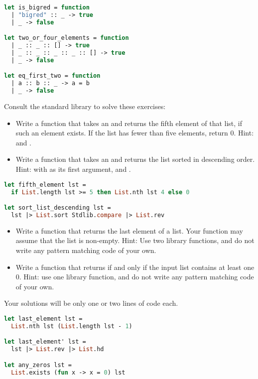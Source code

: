 \begin{lstlisting}[language=Caml]
let is_bigred = function
  | "bigred" :: _ -> true
  | _ -> false

let two_or_four_elements = function
  | _ :: _ :: [] -> true
  | _ :: _ :: _ :: _ :: [] -> true
  | _ -> false

let eq_first_two = function
  | a :: b :: _ -> a = b
  | _ -> false
\end{lstlisting}

\problem[library]
Consult the  standard library to solve these exercises:
\begin{itemize}
  \item Write a function that takes an  and returns the fifth element of that list, if such an element exists. If the list has fewer than five elements, return 0. Hint:  and .
  \item Write a function that takes an  and returns the list sorted in descending order. Hint:  with  as its first argument, and .
\end{itemize}

\begin{lstlisting}[language=OCaml]
let fifth_element lst =
  if List.length lst >= 5 then List.nth lst 4 else 0

let sort_list_descending lst = 
  lst |> List.sort Stdlib.compare |> List.rev
\end{lstlisting}

\begin{itemize}
  \item Write a function that returns the last element of a list. Your function may assume that the list is non-empty. Hint: Use two library functions, and do not write any pattern matching code of your own.
  \item Write a function  that returns  if and only if the input list contains at least one 0. Hint: use one library function, and do not write any pattern matching code of your own.
\end{itemize}
Your solutions will be only one or two lines of code each.

\begin{lstlisting}[language=OCaml]
let last_element lst = 
  List.nth lst (List.length lst - 1)

let last_element' lst = 
  lst |> List.rev |> List.hd

let any_zeros lst = 
  List.exists (fun x -> x = 0) lst
\end{lstlisting}

